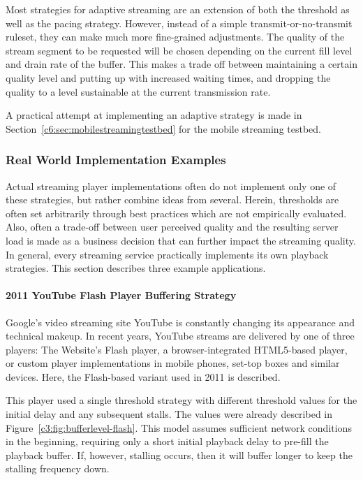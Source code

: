 Most strategies for adaptive streaming are an extension of both the threshold as well as the pacing strategy. However, instead of a simple transmit-or-no-transmit ruleset, they can make much more fine-grained adjustments. The quality of the stream segment to be requested will be chosen depending on the current fill level and drain rate of the buffer. This makes a trade off between maintaining a certain quality level and putting up with increased waiting times, and dropping the quality to a level sustainable at the current transmission rate.

A practical attempt at implementing an adaptive strategy is made in Section~\ref{c6:sec:mobilestreamingtestbed} for the mobile streaming testbed.


\subsubsection{Real World Implementation Examples}

Actual streaming player implementations often do not implement only one of these strategies, but rather combine ideas from several. Herein, thresholds are often set arbitrarily through best practices which are not empirically evaluated. Also, often a trade-off between user perceived quality and the resulting server load is made as a business decision that can further impact the streaming quality. In general, every streaming service practically implements its own playback strategies. This section describes three example applications.

\paragraph{2011 YouTube Flash Player Buffering Strategy}

Google's video streaming site YouTube is constantly changing its appearance and technical makeup. In recent years, YouTube streams are delivered by one of three players: The Website's Flash player, a browser-integrated \acrshort{HTML}5-based player, or custom player implementations in mobile phones, set-top boxes and similar devices. Here, the Flash-based variant used in 2011 is described.

This player used a single threshold strategy with different threshold values for the initial delay and any subsequent stalls. The values were already described in Figure~\ref{c3:fig:bufferlevel-flash}. This model assumes sufficient network conditions in the beginning, requiring only a short initial playback delay to pre-fill the playback buffer. If, however, stalling occurs, then it will buffer longer to keep the stalling frequency down.

